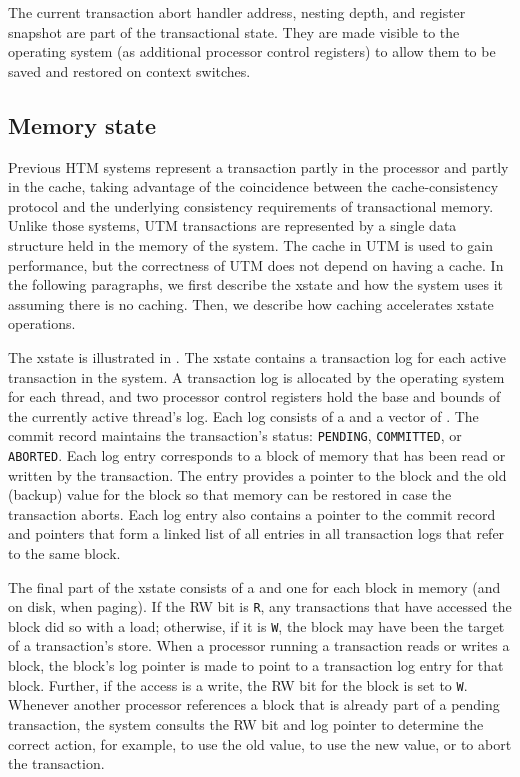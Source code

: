 The current transaction abort handler address, nesting depth, and
register snapshot are part of the transactional state.  They are made
visible to the operating system (as additional processor control
registers) to allow them to be saved and restored on context switches.

\subsection{Memory state}

Previous HTM systems \cite{Knight86,HerlihyMo93} represent a
transaction partly in the processor and partly in the cache, taking
advantage of the coincidence between the cache-consistency protocol
and the underlying consistency requirements of transactional memory.
Unlike those systems, UTM transactions are represented by a single
 data structure held in the memory of the system.  The
cache in UTM is used to gain performance, but the correctness of
UTM does not depend on having a cache.  In the following
paragraphs, we first describe the xstate and how the system uses it
assuming there is no caching.  Then, we describe how caching
accelerates xstate operations.

The xstate is illustrated in .  The xstate
contains a transaction log for each active transaction in the system.
A transaction log is allocated by the operating system for each
thread, and two processor control registers hold the base and bounds
of the currently active thread's log.  Each log consists of a
 and a vector of .  The commit
record maintains the transaction's status: \texttt{PENDING},
\texttt{COMMITTED}, or \texttt{ABORTED}.  Each log entry corresponds
to a block of memory that has been read or written by the transaction.
The entry provides a pointer to the block and the old (backup) value
for the block so that memory can be restored in case the transaction
aborts.  Each log entry also contains a pointer to the commit record
and pointers that form a linked list of all entries in all transaction
logs that refer to the same block.

The final part of the xstate consists of a  and one
 for each block in memory (and on disk, when paging).  If
the RW bit is \texttt{R}, any transactions that have accessed the
block did so with a load; otherwise, if it is \texttt{W}, the block
may have been the target of a transaction's store.  When a processor
running a transaction reads or writes a block, the block's log pointer
is made to point to a transaction log entry for that block.  Further,
if the access is a write, the RW bit for the block is set to
\texttt{W}.  Whenever another processor references a block that is
already part of a pending transaction, the system consults the RW bit
and log pointer to determine the correct action, for example, to use
the old value, to use the new value, or to abort the transaction.

